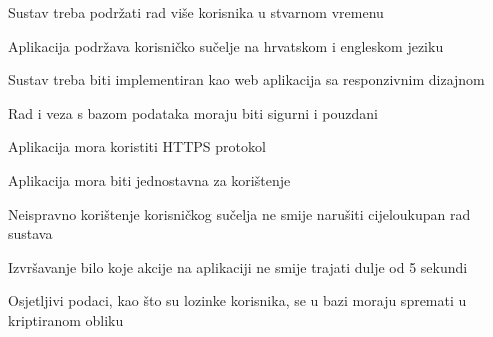 			\begin{packed_item}
				\item Sustav treba podržati rad više korisnika u stvarnom vremenu
				\item Aplikacija podržava korisničko sučelje na hrvatskom i engleskom jeziku
				\item Sustav treba biti implementiran kao web aplikacija sa responzivnim dizajnom
				\item Rad i veza s bazom podataka moraju biti sigurni i pouzdani
				\item Aplikacija mora koristiti HTTPS protokol
				\item Aplikacija mora biti jednostavna za korištenje
				\item Neispravno korištenje korisničkog sučelja ne smije narušiti cijeloukupan rad sustava
				\item Izvršavanje bilo koje akcije na aplikaciji ne smije trajati dulje od 5 sekundi
				\item Osjetljivi podaci, kao što su lozinke korisnika, se u bazi moraju spremati u kriptiranom obliku
			\end{packed_item}
			